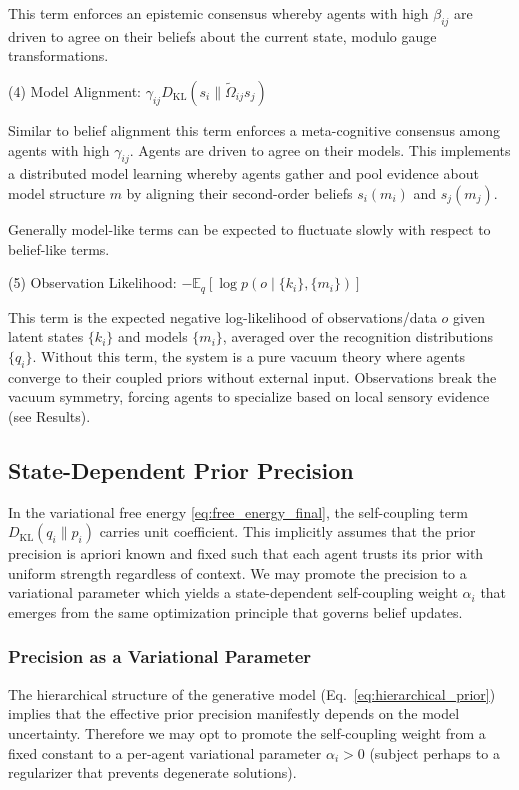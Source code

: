 \documentclass[twoside,11pt]{article}
\begin{document}
This term enforces an epistemic consensus whereby agents with high $\beta_{ij}$ are driven to agree on their beliefs about the current state, modulo gauge transformations. 

(4) Model Alignment: $\gamma_{ij} D_{\mathrm{KL}}(s_i \| \tilde{\Omega}_{ij} s_j)$

Similar to belief alignment this term enforces a meta-cognitive consensus among agents with high $\gamma_{ij}$. Agents are driven to agree on their models. This implements a distributed model learning whereby agents gather and pool evidence about model structure $m$ by aligning their second-order beliefs $s_i(m_i)$ and $s_j(m_j)$.

Generally model-like terms can be expected to fluctuate slowly with respect to belief-like terms.

(5) Observation Likelihood: $-\mathbb{E}_q[\log p(o \mid \{k_i\}, \{m_i\})]$

This term is the expected negative log-likelihood of observations/data $o$ given latent states $\{k_i\}$ and models $\{m_i\}$, averaged over the recognition distributions $\{q_i\}$. Without this term, the system is a pure vacuum theory where agents converge to their coupled priors without external input. Observations break the vacuum symmetry, forcing agents to specialize based on local sensory evidence (see Results).

\subsection{State-Dependent Prior Precision}
\label{sec:state_dependent_precision}

In the variational free energy \eqref{eq:free_energy_final}, the self-coupling term $D_{\mathrm{KL}}(q_i \| p_i)$ carries unit coefficient. This implicitly assumes that the prior precision is apriori known and fixed such that each agent trusts its prior with uniform strength regardless of context. We may promote the precision to a variational parameter which yields a state-dependent self-coupling weight $\alpha_i$ that emerges from the same optimization principle that governs belief updates.

\subsubsection{Precision as a Variational Parameter}

The hierarchical structure of the generative model (Eq.~\ref{eq:hierarchical_prior}) implies that the effective prior precision manifestly depends on the model uncertainty. Therefore we may opt to promote the self-coupling weight from a fixed constant to a per-agent variational parameter $\alpha_i > 0$ (subject perhaps to a regularizer that prevents degenerate solutions).
\end{document}
